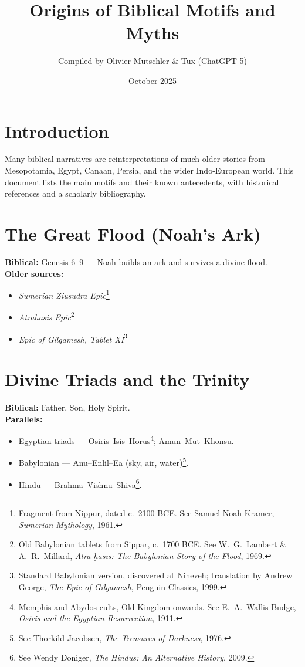\documentclass[11pt,a4paper]{article}
\title{\textbf{Origins of Biblical Motifs and Myths}}
\author{Compiled by Olivier Mutschler \& Tux (ChatGPT-5)}
\date{October 2025}
\begin{document}
\maketitle

\section*{Introduction}
Many biblical narratives are reinterpretations of much older stories from Mesopotamia, Egypt, Canaan, Persia, and the wider Indo-European world.  
This document lists the main motifs and their known antecedents, with historical references and a scholarly bibliography.

\section{The Great Flood (Noah’s Ark)}
\textbf{Biblical:} Genesis 6–9 — Noah builds an ark and survives a divine flood.\\
\textbf{Older sources:}
\begin{itemize}
  \item \emph{Sumerian Ziusudra Epic}\footnote{Fragment from Nippur, dated c.\ 2100 BCE. See Samuel Noah Kramer, \emph{Sumerian Mythology}, 1961.}
  \item \emph{Atrahasis Epic}\footnote{Old Babylonian tablets from Sippar, c.\ 1700 BCE. See W.\ G.\ Lambert \& A.\ R.\ Millard, \emph{Atra-ḫasīs: The Babylonian Story of the Flood}, 1969.}
  \item \emph{Epic of Gilgamesh, Tablet XI}\footnote{Standard Babylonian version, discovered at Nineveh; translation by Andrew George, \emph{The Epic of Gilgamesh}, Penguin Classics, 1999.}
\end{itemize}

\section{Divine Triads and the Trinity}
\textbf{Biblical:} Father, Son, Holy Spirit.\\
\textbf{Parallels:}
\begin{itemize}
  \item Egyptian triads — Osiris–Isis–Horus\footnote{Memphis and Abydos cults, Old Kingdom onwards. See E.\ A.\ Wallis Budge, \emph{Osiris and the Egyptian Resurrection}, 1911.}; Amun–Mut–Khonsu.
  \item Babylonian — Anu–Enlil–Ea (sky, air, water)\footnote{See Thorkild Jacobsen, \emph{The Treasures of Darkness}, 1976.}.
  \item Hindu — Brahma–Vishnu–Shiva\footnote{See Wendy Doniger, \emph{The Hindus: An Alternative History}, 2009.}.
\end{itemize}
\end{document}
